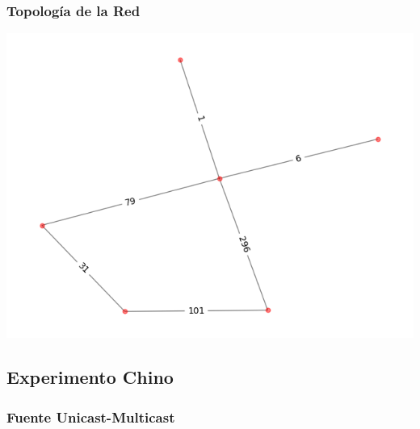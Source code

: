 \subsubsection{Topolog\'ia de la Red}
 \includegraphics[scale=0.6]{../plots/mauro_s2_topologia.png}

\subsection{Experimento Chino}

\subsubsection{Fuente Unicast-Multicast}

